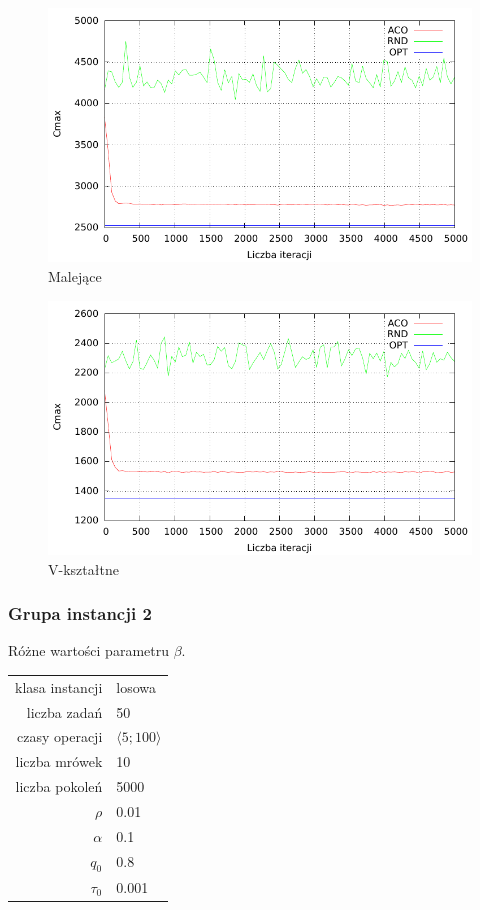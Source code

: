\documentclass[10pt,a4paper]{article}
\begin{document}
\newpage
\begin{figure}[h]
    \centering
    \includegraphics{./figures/inst03_dsc_smooth.pdf}
    \caption{Malejące}
\end{figure}


\newpage
\begin{figure}[h]
    \centering
    \includegraphics{./figures/inst04_vsh_smooth.pdf}
    \caption{V-kształtne}
\end{figure}


\newpage
\subsubsection{Grupa instancji 2}
Różne wartości parametru $\beta$.

\begin{center}
\begin{tabular}{|r|l|}
  \hline
  klasa instancji & losowa \\
  liczba zadań & 50 \\
  czasy operacji & $ \langle 5;100 \rangle $  \\
  liczba mrówek & 10 \\
  liczba pokoleń & 5000 \\
  $ \rho $ & 0.01 \\
  $ \alpha $ & 0.1 \\
  $ q_0 $ & 0.8 \\
  $ \tau_0 $ & 0.001 \\
  \hline
\end{tabular}
\end{center}
\end{document}
